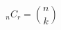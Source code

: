 \documentclass[preview]{standalone}
\begin{document}
\begin{center}
\[ {}_nC_r = \binom{n}{k} \]
\end{center}
\end{document}
